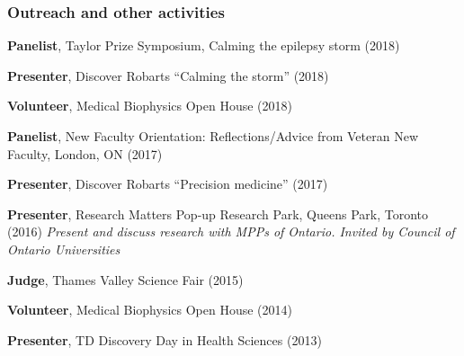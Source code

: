 \subsubsection*{Outreach and other activities}

\begin{packed_enum}
\item \textbf{Panelist}, Taylor Prize Symposium, Calming the epilepsy storm (2018)
\item \textbf{Presenter}, Discover Robarts ``Calming the storm'' (2018)
\item \textbf{Volunteer}, Medical Biophysics Open House (2018)
\item \textbf{Panelist}, New Faculty Orientation: Reflections/Advice from Veteran New Faculty, London, ON (2017)
\item \textbf{Presenter}, Discover Robarts ``Precision medicine'' (2017)
\item \textbf{Presenter}, Research Matters Pop-up Research Park, Queens Park, Toronto (2016) \textit{ Present and discuss research with MPPs of Ontario. Invited by Council of Ontario Universities}
\item \textbf{Judge}, Thames Valley Science Fair (2015)
\item \textbf{Volunteer}, Medical Biophysics Open House (2014)
\item \textbf{Presenter}, TD Discovery Day in Health Sciences (2013)
\end{packed_enum}


